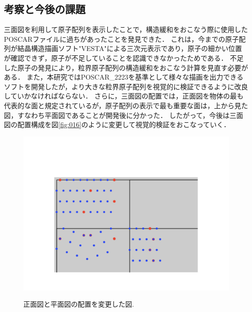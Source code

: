 \subsection{考察と今後の課題}
三面図を利用して原子配列を表示したことで，構造緩和をおこなう際に使用したPOSCARファイルに過ちがあったことを発見できた．
これは，今までの原子配列が結晶構造描画ソフト"VESTA"による三次元表示であり，原子の細かい位置が確認できず，原子が不足していることを認識できなかったためである．
不足した原子の発見により，粒界原子配列の構造緩和をおこなう計算を見直す必要がある．
また，本研究ではPOSCAR\_2223を基準として様々な描画を出力できるソフトを開発したが，より大きな粒界原子配列を視覚的に検証できるように改良していかなければならない．
さらに，三面図の配置では，正面図を物体の最も代表的な面と規定されているが，原子配列の表示で最も重要な面は，上から見た図，すなわち平面図であることが開発後に分かった．
したがって，今後は三面図の配置構成を図\ref{fig:016}のように変更して視覚的検証をおこなっていく．

\begin{figure}[htbp]\begin{center}
\includegraphics[width=12cm,bb= 0 0 937 753]{../figs/./boundary_narita.016.jpeg}
\caption{正面図と平面図の配置を変更した図.}
\label{fig:016}
\label{default}\end{center}\end{figure}
